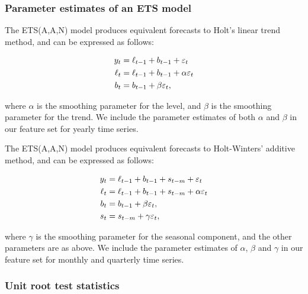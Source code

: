 \documentclass[11pt,a4paper,]{article}
\theoremstyle{definition}
\theoremstyle{definition}
\theoremstyle{definition}
\theoremstyle{remark}
\begin{document}
\subsubsection*{Parameter estimates of an ETS
model}\label{parameter-estimates-of-an-ets-model}

The ETS(A,A,N) model \autocite{expsmooth08} produces equivalent
forecasts to Holt's linear trend method, and can be expressed as
follows:\vspace*{-.9cm}

\begin{align*}
  y_t    & = \ell_{t-1}+b_{t-1}+\varepsilon_t\\
  \ell_t & = \ell_{t-1}+b_{t-1}+\alpha \varepsilon_t\\
  b_t    & = b_{t-1}+\beta \varepsilon_t,\vspace*{-0.99cm}
\end{align*}

where \(\alpha\) is the smoothing parameter for the level, and \(\beta\)
is the smoothing parameter for the trend. We include the parameter
estimates of both \(\alpha\) and \(\beta\) in our feature set for yearly
time series.

The ETS(A,A,N) model \autocite{expsmooth08} produces equivalent
forecasts to Holt-Winters' additive method, and can be expressed as
follows:\vspace*{-.9cm}

\begin{align*}
  y_t    & = \ell_{t-1}+b_{t-1}+s_{t-m}+\varepsilon_t\\
  \ell_t & = \ell_{t-1}+b_{t-1}+s_{t-m}+\alpha \varepsilon_t\\
  b_t    & = b_{t-1}+\beta \varepsilon_t,\\
  s_t &= s_{t-m} + \gamma\varepsilon_t,\vspace*{-0.99cm}
\end{align*}

where \(\gamma\) is the smoothing parameter for the seasonal component,
and the other parameters are as above. We include the parameter
estimates of \(\alpha\), \(\beta\) and \(\gamma\) in our feature set for
monthly and quarterly time series.

\subsubsection*{Unit root test
statistics}\label{unit-root-test-statistics}
\end{document}
